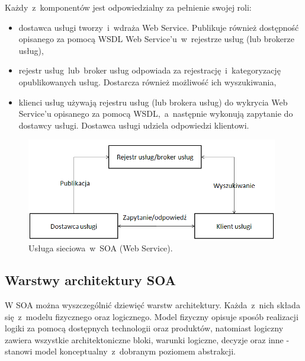 Każdy~z~komponentów jest odpowiedzialny za pełnienie swojej roli:
\begin{itemize}
\item{dostawca usługi tworzy~i~wdraża Web Service. Publikuje również dostępność opisanego za pomocą WSDL Web Service’u~w~rejestrze usług (lub brokerze usług),}
\item{rejestr usług~lub~broker usług odpowiada za rejestrację~i~kategoryzację opublikowanych usług. Dostarcza również możliwość ich wyszukiwania,} 
\item{klienci usług używają rejestru usług (lub brokera usług) do wykrycia Web Service’u opisanego za pomocą WSDL,~a~następnie wykonują zapytanie do dostawcy usługi. Dostawca usługi udziela odpowiedzi klientowi.}
\end{itemize}

\begin{figure}[h!tbp]
\begin{centering}
\includegraphics[width=11cm]{img/web_service.png}
\caption[Usługa sieciowa~w~SOA (Web Service).]{Usługa sieciowa~w~SOA (Web Service). }\label{WSArchFunc}
\end{centering}
\end{figure}

\subsection{Warstwy architektury SOA}
W SOA można wyszczególnić dziewięć warstw architektury. Każda~z~nich składa się~z~modelu fizycznego oraz logicznego. Model fizyczny opisuje sposób realizacji logiki za pomocą dostępnych technologii oraz produktów, natomiast logiczny zawiera wszystkie architektoniczne bloki, warunki logiczne, decyzje oraz inne - stanowi model konceptualny~z~dobranym poziomem abstrakcji.

